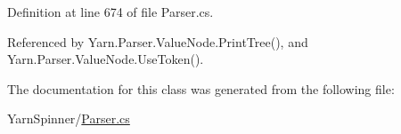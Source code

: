 Definition at line 674 of file Parser.\-cs.



Referenced by Yarn.\-Parser.\-Value\-Node.\-Print\-Tree(), and Yarn.\-Parser.\-Value\-Node.\-Use\-Token().



The documentation for this class was generated from the following file\-:\begin{DoxyCompactItemize}
\item 
Yarn\-Spinner/\hyperlink{a00301}{Parser.\-cs}\end{DoxyCompactItemize}
